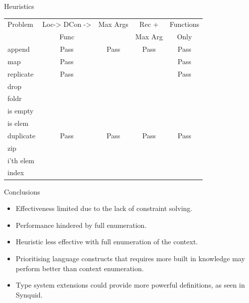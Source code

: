 \documentclass[presentation]{beamer}
\begin{document}
\begin{frame}[fragile]{Heuristics}
\begin{center}
\begin{tabular}{|l|c|c|c|c|}
  
\hline
Problem & Loc-> DCon -> & Max Args & Rec + & Functions \\
 & Func & & Max Arg & Only \\
\hline
append & Pass & Pass & Pass & Pass\\
map & Pass  & & & Pass\\
replicate & Pass & & & Pass\\
drop &   & & & \\
foldr &   & & & \\
is empty &   & & & \\
is elem &   &  & & \\
duplicate & Pass & Pass & Pass & Pass\\
zip &   & & & \\
i'th elem &  & & & \\ 
index &   &  & & \\
\hline
\end{tabular}
\end{center}
\end{frame}


\begin{frame}[fragile]{Conclusions}
  \begin{itemize}
  \item Effectiveness limited due to the lack of constraint solving.\\
  \item Performance hindered by full enumeration.\\
  \item Heuristic less effective with full enumeration of the context.\\
  \item Prioritising language constructs that requires more built in knowledge may
    perform better than context enumeration.\\
  \item Type system extensions could provide more powerful definitions, as seen in Synquid.   
  \end{itemize}
\end{frame}
\end{document}
